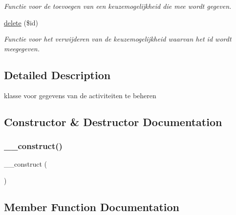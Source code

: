 \begin{DoxyCompactItemize}
\begin{DoxyCompactList}\small\item\em Functie voor de toevoegen van een keuzemogelijkheid die mee wordt gegeven. \end{DoxyCompactList}\item 
\mbox{\hyperlink{class_keuzemogelijkheid___model_a2f8258add505482d7f00ea26493a5723}{delete}} (\$id)
\begin{DoxyCompactList}\small\item\em Functie voor het verwijderen van de keuzemogelijkheid waarvan het id wordt meegegeven. \end{DoxyCompactList}\end{DoxyCompactItemize}


\subsection{Detailed Description}
klasse voor gegevens van de activiteiten te beheren 

\subsection{Constructor \& Destructor Documentation}
\mbox{\label{class_keuzemogelijkheid___model_a095c5d389db211932136b53f25f39685}} 
\subsubsection{\texorpdfstring{\+\_\+\+\_\+construct()}{\_\_construct()}}
{\footnotesize\ttfamily \+\_\+\+\_\+construct (\begin{DoxyParamCaption}{ }\end{DoxyParamCaption})}



\subsection{Member Function Documentation}
\mbox{\label{class_keuzemogelijkheid___model_ab3ea46c3ea11cbb463eb98238e38c580}} 
